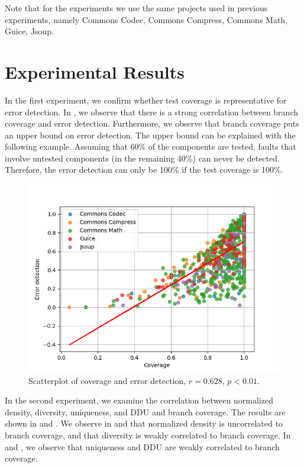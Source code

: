 \documentclass[twoside,a4paper,11pt]{memoir}
\begin{document}
Note that for the experiments we use the same projects used in previous experiments, namely Commons Codec, Commons Compress, Commons Math, Guice, Jsoup.

\section{Experimental Results}
In the first experiment, we confirm whether test coverage is representative for error detection.
In , we observe that there is a strong correlation between branch coverage and error detection.
Furthermore, we observe that branch coverage puts an upper bound on error detection.
The upper bound can be explained with the following example.
Assuming that 60\% of the components are tested, faults that involve untested components (in the remaining 40\%) can never be detected.
Therefore, the error detection can only be 100\% if the test coverage is 100\%.
\begin{figure}
  \includegraphics[width=\linewidth]{figures/coverage_error_detection}
  \caption{Scatterplot of coverage and error detection, \(r = 0.628 \), \(p < 0.01 \).}%
  \label{fig:coverage_error_detection}
\end{figure}

In the second experiment, we examine the correlation between normalized density, diversity, uniqueness, and DDU and branch coverage.
The results are shown in  and .
We observe in  and  that normalized density is uncorrelated to branch coverage, and that diversity is weakly correlated to branch coverage.
In  and , we observe that uniqueness and DDU are weakly correlated to branch coverage.
\end{document}
